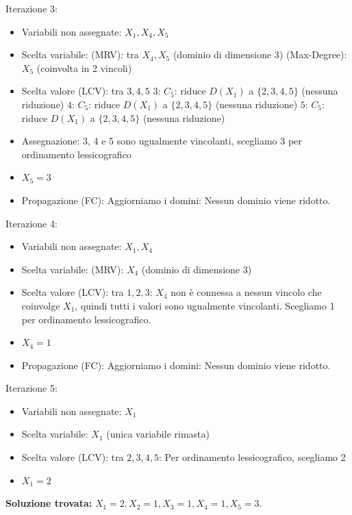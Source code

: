 \documentclass[a4paper,11pt]{article}
\begin{document}
\noindent Iterazione 3:
\begin{itemize}
  \item Variabili non assegnate: {$X_1, X_4, X_5$}
  \item Scelta variabile:
  \subitem (MRV): tra $X_4, X_5$ (dominio di dimensione 3)
  \subitem (Max-Degree): $X_5$ (coinvolta in 2 vincoli)
  \item Scelta valore (LCV): tra $3, 4, 5$
  \subitem $3$:
  \subsubitem $C_5$: riduce $D(X_1)$ a $\{2, 3, 4, 5\}$ (nessuna riduzione)
  \subitem $4$:
  \subsubitem $C_5$: riduce $D(X_1)$ a $\{2, 3, 4, 5\}$ (nessuna riduzione)
  \subitem $5$:
  \subsubitem $C_5$: riduce $D(X_1)$ a $\{2, 3, 4, 5\}$ (nessuna riduzione)
  \item Assegnazione: 3, 4 e 5 sono ugualmente vincolanti, scegliamo 3 per ordinamento lessicografico
  \item $X_5 = 3$
  \item Propagazione (FC): Aggiorniamo i domini: Nessun dominio viene ridotto.
\end{itemize}

\noindent Iterazione 4:
\begin{itemize}
  \item Variabili non assegnate: {$X_1, X_4$}
  \item Scelta variabile:
  \subitem (MRV): $X_4$ (dominio di dimensione 3)
  \item Scelta valore (LCV): tra $1, 2, 3$: $X_4$ non è connessa a nessun vincolo che coinvolge $X_1$, quindi tutti i valori sono ugualmente vincolanti. Scegliamo 1 per ordinamento lessicografico.
  \item $X_4 = 1$
  \item Propagazione (FC): Aggiorniamo i domini: Nessun dominio viene ridotto.
\end{itemize}

\noindent Iterazione 5:
\begin{itemize}
  \item Variabili non assegnate: {$X_1$}
  \item Scelta variabile: $X_1$ (unica variabile rimasta)
  \item Scelta valore (LCV): tra $2, 3, 4, 5$: Per ordinamento lessicografico, scegliamo 2
  \item $X_1 = 2$
\end{itemize}

\textbf{Soluzione trovata:} $X_1 = 2, X_2 = 1, X_3 = 1, X_4 = 1, X_5 = 3$.
\end{document}
